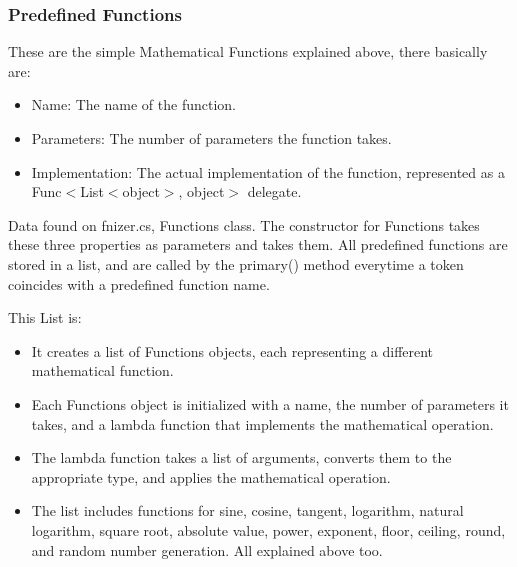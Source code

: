 \subsubsection{Predefined Functions}
These are the simple Mathematical Functions explained above, there basically are:
\begin{itemize}
    \item Name: The name of the function.
    \item Parameters: The number of parameters the function takes.
    \item Implementation: The actual implementation of the function, represented as a Func$<$List$<$object$>$, object$>$ delegate.
\end{itemize}
Data found on fnizer.cs, Functions class.
The constructor for Functions takes these three properties as parameters and takes them.
All predefined functions are stored in a list, and are called by the primary{()} method everytime a token coincides with a predefined function name.

This List is:
\begin{itemize}
    \item It creates a list of Functions objects, each representing a different mathematical function.
    \item Each Functions object is initialized with a name, the number of parameters it takes, and a lambda function that implements the mathematical operation.
    \item The lambda function takes a list of arguments, converts them to the appropriate type, and applies the mathematical operation.
    \item The list includes functions for sine, cosine, tangent, logarithm, natural logarithm, square root, absolute value, power, exponent, floor, ceiling, round, and random number generation. All explained above too.
\end{itemize}